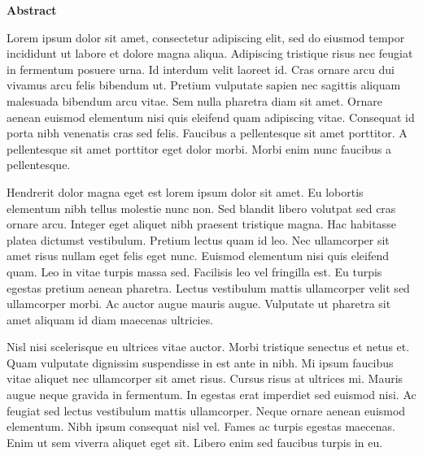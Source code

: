{\Huge \bfseries Abstract}
\vskip 1cm

Lorem ipsum dolor sit amet, consectetur adipiscing elit, sed do eiusmod tempor incididunt ut labore et dolore magna aliqua. Adipiscing tristique risus nec feugiat in fermentum posuere urna. Id interdum velit laoreet id. Cras ornare arcu dui vivamus arcu felis bibendum ut. Pretium vulputate sapien nec sagittis aliquam malesuada bibendum arcu vitae. Sem nulla pharetra diam sit amet. Ornare aenean euismod elementum nisi quis eleifend quam adipiscing vitae. Consequat id porta nibh venenatis cras sed felis. Faucibus a pellentesque sit amet porttitor. A pellentesque sit amet porttitor eget dolor morbi. Morbi enim nunc faucibus a pellentesque.

Hendrerit dolor magna eget est lorem ipsum dolor sit amet. Eu lobortis elementum nibh tellus molestie nunc non. Sed blandit libero volutpat sed cras ornare arcu. Integer eget aliquet nibh praesent tristique magna. Hac habitasse platea dictumst vestibulum. Pretium lectus quam id leo. Nec ullamcorper sit amet risus nullam eget felis eget nunc. Euismod elementum nisi quis eleifend quam. Leo in vitae turpis massa sed. Facilisis leo vel fringilla est. Eu turpis egestas pretium aenean pharetra. Lectus vestibulum mattis ullamcorper velit sed ullamcorper morbi. Ac auctor augue mauris augue. Vulputate ut pharetra sit amet aliquam id diam maecenas ultricies.

Nisl nisi scelerisque eu ultrices vitae auctor. Morbi tristique senectus et netus et. Quam vulputate dignissim suspendisse in est ante in nibh. Mi ipsum faucibus vitae aliquet nec ullamcorper sit amet risus. Cursus risus at ultrices mi. Mauris augue neque gravida in fermentum. In egestas erat imperdiet sed euismod nisi. Ac feugiat sed lectus vestibulum mattis ullamcorper. Neque ornare aenean euismod elementum. Nibh ipsum consequat nisl vel. Fames ac turpis egestas maecenas. Enim ut sem viverra aliquet eget sit. Libero enim sed faucibus turpis in eu.
